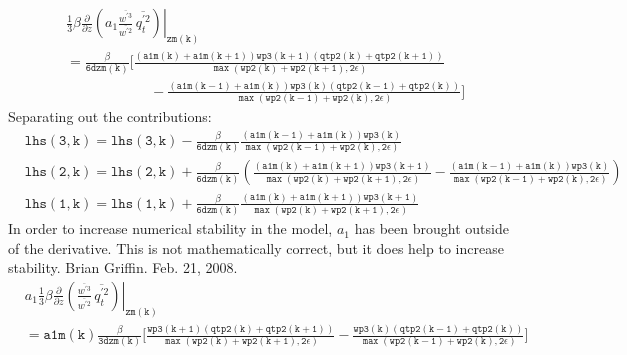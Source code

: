 \documentclass[11pt,fleqn]{article}
\newcommand{\ptlder}[2]{\frac{\partial #1}{\partial #2}}
\begin{document}
\begin{equation}
\begin{split}
& \left.
  \frac{1}{3} \beta
   \ptlder{}{z}
     \left( 
       a_1
       \frac{\overline{w^{'3}}}{\overline{w^{'2}}} \,
       \overline{q_t^{'2}}
     \right)
   \right|_{\mathtt{zm(k)}} \\
&= \mathtt{
    \frac{\beta}{6 dzm(k)}
    \bigg[ \frac{\left(a1m(k)+a1m(k+1)\right) wp3(k+1) \left(qtp2(k)+qtp2(k+1) \right)}
                {\max\left(wp2(k)+wp2(k+1),2\epsilon\right)} } \\
&  \mathtt{ \quad \quad \quad \quad \quad \quad
          -\frac{\left(a1m(k-1)+a1m(k)\right) wp3(k) \left(qtp2(k-1)+qtp2(k) \right)}
                {\max\left(wp2(k-1)+wp2(k),2\epsilon\right)}
    \bigg]
    }
\end{split}
\end{equation}
%
Separating out the contributions:
%
\begin{equation}
\begin{split}
& \mathtt{ 
   lhs(3,k) = lhs(3,k) - \frac{\beta}{6 dzm(k)}
                 \frac{\left(a1m(k-1)+a1m(k)\right) wp3(k)}
                      {\max\left(wp2(k-1)+wp2(k),2\epsilon\right)}
  } \\
& \mathtt{
   lhs(2,k) = lhs(2,k) + \frac{\beta}{6 dzm(k)}
                 \left(
                   \frac{\left(a1m(k)+a1m(k+1)\right) wp3(k+1)}
                        {\max\left(wp2(k)+wp2(k+1),2\epsilon\right)}
                  -\frac{\left(a1m(k-1)+a1m(k)\right) wp3(k)}
                        {\max\left(wp2(k-1)+wp2(k),2\epsilon\right)}
                 \right)
  } \\
& \mathtt{
   lhs(1,k) = lhs(1,k) + \frac{\beta}{6 dzm(k)}
                 \frac{\left(a1m(k)+a1m(k+1)\right) wp3(k+1)}
                      {\max\left(wp2(k)+wp2(k+1),2\epsilon\right)}
  }
\end{split}
\end{equation}
%
In order to increase numerical stability in the model, $a_{1}$ has been brought
outside of the derivative.  This is not mathematically correct, but it does 
help to increase stability.  Brian Griffin.  Feb. 21, 2008.
% 
\begin{equation}
\begin{split}
& \left.
  a_1
  \frac{1}{3} \beta
   \ptlder{}{z}
     \left( 
       \frac{\overline{w^{'3}}}{\overline{w^{'2}}} \,
       \overline{q_t^{'2}}
     \right)
   \right|_{\mathtt{zm(k)}} \\
&= \mathtt{
    a1m(k)
    \frac{\beta}{3 dzm(k)}
    \bigg[ \frac{wp3(k+1) \left(qtp2(k)+qtp2(k+1) \right)}
                {\max\left(wp2(k)+wp2(k+1),2\epsilon\right)}
          -\frac{wp3(k) \left(qtp2(k-1)+qtp2(k) \right)}
                {\max\left(wp2(k-1)+wp2(k),2\epsilon\right)}
    \bigg]
    }
\end{split}
\end{equation}
\end{document}
